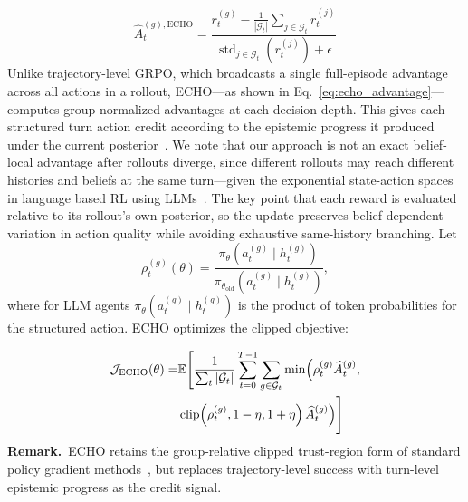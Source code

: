 \documentclass[11pt]{article}
\theoremstyle{plain}
\theoremstyle{definition}
\theoremstyle{remark}
\begin{document}
    \begin{equation}
    \widehat{A}_{t}^{(g),\mathrm{ECHO}}
    =
    \frac{
        r_t^{(g)}
        -
        \frac{1}{|\mathcal{G}_t|}
        \sum_{j\in\mathcal{G}_t} r_t^{(j)}
    }{
        \operatorname{std}_{j\in\mathcal{G}_t}(r_t^{(j)})+\epsilon
    }
    \label{eq:echo_advantage}
\end{equation}
Unlike trajectory-level GRPO, which broadcasts a single full-episode advantage across all actions in a rollout, \textsc{ECHO}—as shown in Eq.~\ref{eq:echo_advantage}—computes group-normalized advantages at each decision depth. This gives each structured turn action credit according to the epistemic progress it produced under the current posterior~\citep{jin2026dgpo, nath2026owen, samineni2026rlonlyanalyzingstructural}. We note that our approach is not an exact belief-local advantage after rollouts diverge, since different rollouts may reach different histories and beliefs at the same turn—given the exponential state-action spaces in language based RL using LLMs~\citep{dong2024rlhf, srivastava2024policy, zhou2024archer}. The key point that each reward is evaluated relative to its rollout's own posterior, so the update preserves belief-dependent variation in action quality while avoiding exhaustive same-history branching.
%
Let
\[
    \rho_t^{(g)}(\theta)
    =
    \frac{
        \pi_\theta(a_t^{(g)}\mid h_t^{(g)})
    }{
        \pi_{\theta_{\mathrm{old}}}(a_t^{(g)}\mid h_t^{(g)})
    },
\]
where for LLM agents \(\pi_\theta(a_t^{(g)}\mid h_t^{(g)})\) is the product of token probabilities for the structured action. \textsc{ECHO} optimizes the clipped objective:
\begin{theorybox}
\begin{align}
    \mathcal{J}_{\mathrm{ECHO}}(\theta)
    =
    &\notag\mathbb{E}
    \Bigg[
    \frac{1}{\sum_t |\mathcal{G}_t|}
    \sum_{t=0}^{T-1}
    \sum_{g\in\mathcal{G}_t}
    \min\!\Big(
        \rho_t^{(g)}\widehat{A}_{t}^{(g)},\\
        &\operatorname{clip}\!\left(
            \rho_t^{(g)},
            1-\eta,
            1+\eta
        \right)
        \widehat{A}_{t}^{(g)}
    \Big)
    \Bigg]
    \label{eq:echo-objective}
\end{align}
\textbf{Remark.}~\textsc{ECHO} retains the group-relative clipped 
trust-region form of standard policy gradient methods~\citep{schulman2015trust,sutton2018reinforcement,williams92}, but replaces 
trajectory-level success with turn-level epistemic progress as the 
credit signal.
\end{theorybox}
 
\end{document}
